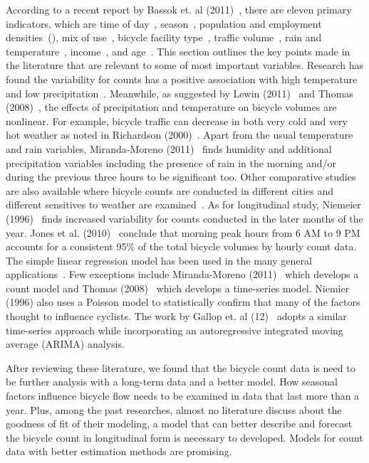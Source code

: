 \documentclass[12pt,letterpaper,article]{memoir} %
\begin{document}
According to a recent report by Bassok et. al (2011)~\cite{Bassok11}, there are eleven primary indicators, which are time of day~\cite{Schwartz99}, season~\cite{Niemeier96}, population and employment densities~(\cite{Pinjari09,McCahil08}), mix of use~\cite{Pinjari09}, bicycle facility type~\cite{Hunt07}, traffic volume~\cite{McDonald07}, rain and temperature~\cite{Parkin08,Niemeier96}, income~\cite{Turner98}, and age~\cite{Hunt07}. This section outlines the key points made in the literature that are relevant to some of most important variables. Research has found the variability for counts has a positive association with high temperature and low precipitation~\cite{Parkin08,Niemeier96}. Meanwhile, as suggested by Lewin (2011)~\cite{Lewin11} and Thomas (2008)~\cite{Thomas08}, the effects of precipitation and temperature on bicycle volumes are nonlinear. For example, bicycle traffic can decrease in both very cold and very hot weather as noted in Richardson (2000)~\cite{Richardson00}. Apart from the usual temperature and rain variables, Miranda-Moreno (2011)~\cite{MM11} finds humidity and additional precipitation variables including the presence of rain in the morning and/or during the previous three hours to be significant too. Other comparative studies are also available where bicycle counts are conducted in different cities and different sensitives to weather are examined~\cite{Rose11}. As for longitudinal study, Niemeier (1996)~\cite{Niemeier96} finds increased variability for counts conducted in the later months of the year. Jones et al. (2010)~\cite{Jones10} conclude that morning peak hours from 6 AM to 9 PM accounts for a consistent 95\% of the total bicycle volumes by hourly count data. The simple linear regression model has been used in the many general applications~\cite{Jones08,Jones10}. Few exceptions include Miranda-Moreno (2011)~\cite{MM11} which develops a count model and Thomas (2008)~\cite{Thomas08} which develops a time-series model. Niemier (1996) also uses a Poisson model to statistically confirm that many of the factors thought to influence cyclists. The work by Gallop et. al (12)~\cite{Gallop12} adopts a similar time-series approach while incorporating an autoregressive integrated moving average (ARIMA) analysis. 

After reviewing these literature, we found that the bicycle count data is need to be further analysis with a long-term data and a better model. How seasonal factors influence bicycle flow needs to be examined in data that last more than a year. Plus, among the past researches, almost no literature discuss about the goodness of fit of their modeling,  a model that can better describe and forecast the bicycle count in longitudinal form is necessary to developed. Models for count data with better estimation methods are promising.
\end{document}
